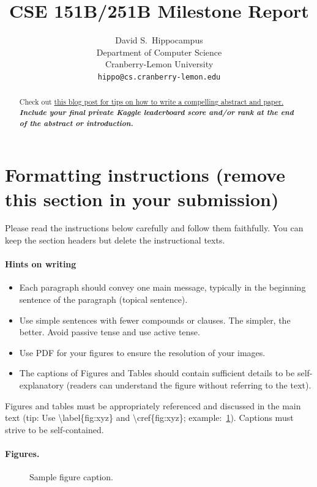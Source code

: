 \documentclass{article}
\title{
CSE 151B/251B Milestone Report
\\
}
\author{%
  David S.~Hippocampus
  \\
  Department of Computer Science\\
  Cranberry-Lemon University\\
  \texttt{hippo@cs.cranberry-lemon.edu} \\
}
\begin{document}
\maketitle


\begin{abstract}
Check out \href{https://www.alignmentforum.org/posts/eJGptPbbFPZGLpjsp/highly-opinionated-advice-on-how-to-write-ml-papers#Abstract}{this blog post for tips on how to write a compelling abstract and paper.} \textbf{\textit{Include your final private Kaggle leaderboard score and/or rank at the end of the abstract or introduction.}}
\end{abstract}

\section*{Formatting instructions (remove this section in your submission)}
Please read the instructions below carefully and follow them faithfully. You can keep the section headers but delete the instructional texts.
\paragraph{Hints on writing}
\begin{itemize}
    \item Each paragraph should convey one main message, typically in the beginning sentence of the paragraph (topical sentence).
    \item  Use simple sentences with fewer compounds or clauses. The simpler, the better. Avoid passive tense and use active tense.
    \item Use PDF for your figures to ensure the resolution of your images.
    \item The captions of Figures and Tables should contain sufficient details to be self-explanatory (readers can understand the figure without referring to the text).
\end{itemize}


Figures and tables must be appropriately referenced and discussed in the main text (tip: Use \textbackslash label\{fig:xyz\} and \textbackslash cref\{fig:xyz\}; example:~\cref{fig:example}). Captions must strive to be self-contained.
\paragraph{Figures.}
\begin{figure} %
  \vspace{-4mm}  %
  \centering
  \fbox{\rule[-.5cm]{0cm}{4cm} \rule[-.5cm]{4cm}{0cm}}
  \caption{Sample figure caption.}
  \label{fig:example}
\end{figure}
\end{document}
